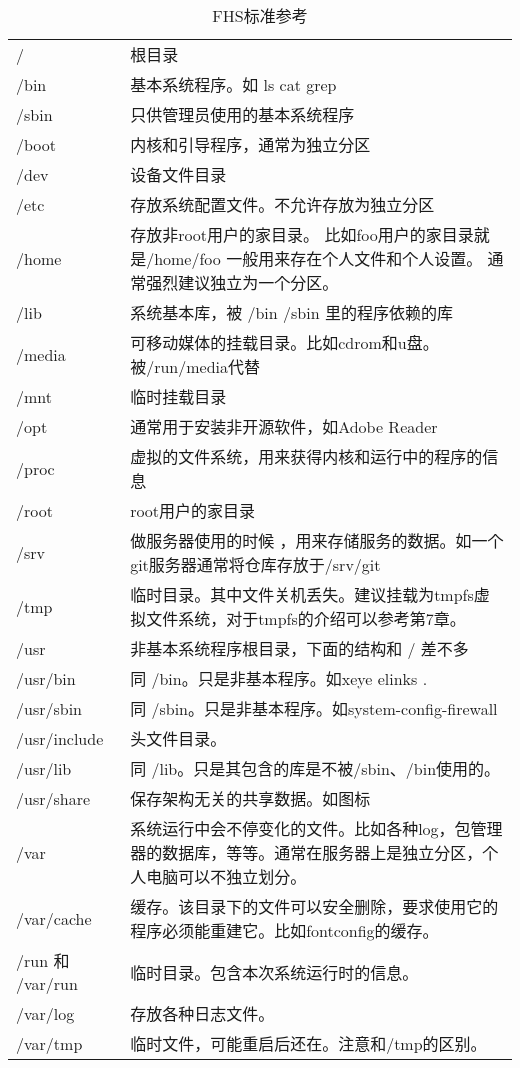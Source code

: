 \begin{longtable}{|l|p{}|}\hline
\caption{FHS标准参考}\\
\hline
/ & 根目录 \\\hline
/bin & 基本系统程序。如 ls cat grep \\\hline
/sbin & 只供管理员使用的基本系统程序 \\\hline
/boot & 内核和引导程序，通常为独立分区\\\hline
/dev & 设备文件目录 \\\hline
/etc & 存放系统配置文件。不允许存放为独立分区\\\hline
/home & 存放非root用户的家目录。 
比如foo用户的家目录就是/home/foo
一般用来存在个人文件和个人设置。
通常强烈建议独立为一个分区。\\\hline
/lib & 系统基本库，被 /bin /sbin 里的程序依赖的库 \\\hline
/media & 可移动媒体的挂载目录。比如cdrom和u盘。被/run/media代替\\\hline
/mnt & 临时挂载目录\\\hline
/opt & 通常用于安装非开源软件，如Adobe Reader \\\hline
/proc & 虚拟的文件系统，用来获得内核和运行中的程序的信息\\\hline
/root & root用户的家目录\\\hline
/srv & 做服务器使用的时候 ，用来存储服务的数据。如一个git服务器通常将仓库存放于/srv/git\\\hline
/tmp & 临时目录。其中文件关机丢失。建议挂载为tmpfs虚拟文件系统，对于tmpfs的介绍可以参考第7章。 \\\hline
/usr & 非基本系统程序根目录，下面的结构和 / 差不多 \\\hline
/usr/bin & 同 /bin。只是非基本程序。如xeye  elinks . \\\hline
/usr/sbin & 同 /sbin。只是非基本程序。如system-config-firewall \\\hline
/usr/include & 头文件目录。\\\hline
/usr/lib & 同 /lib。只是其包含的库是不被/sbin、/bin使用的。\\\hline
/usr/share &  保存架构无关的共享数据。如图标\\\hline
/var & 系统运行中会不停变化的文件。比如各种log，包管理器的数据库，等等。通常在服务器上是独立分区，个人电脑可以不独立划分。\\\hline
/var/cache & 缓存。该目录下的文件可以安全删除，要求使用它的程序必须能重建它。比如fontconfig的缓存。\\\hline
/run 和 /var/run & 临时目录。包含本次系统运行时的信息。\\\hline
/var/log & 存放各种日志文件。\\\hline
/var/tmp & 临时文件，可能重启后还在。注意和/tmp的区别。\\\hline
\end{longtable}


